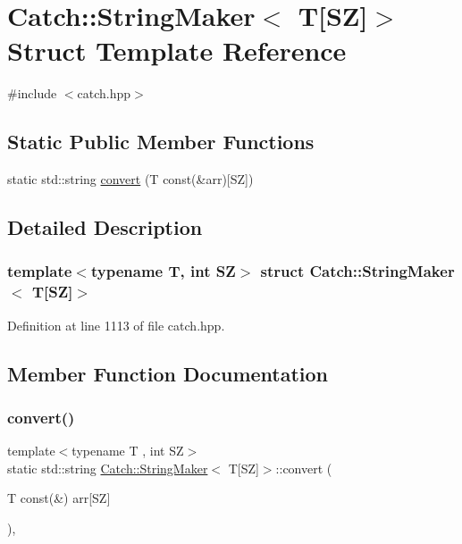 \hypertarget{struct_catch_1_1_string_maker_3_01_t[_s_z]_4}{}\section{Catch\+:\+:String\+Maker$<$ T\mbox{[}SZ\mbox{]}$>$ Struct Template Reference}
\label{struct_catch_1_1_string_maker_3_01_t[_s_z]_4}


{\ttfamily \#include $<$catch.\+hpp$>$}

\subsection*{Static Public Member Functions}
\begin{DoxyCompactItemize}
\item 
static std\+::string \mbox{\hyperlink{struct_catch_1_1_string_maker_3_01_t[_s_z]_4_a3698cea2c24d8649ec9ecb5fa679eeb7}{convert}} (T const(\&arr)\mbox{[}SZ\mbox{]})
\end{DoxyCompactItemize}


\subsection{Detailed Description}
\subsubsection*{template$<$typename T, int SZ$>$\newline
struct Catch\+::\+String\+Maker$<$ T\mbox{[}\+S\+Z\mbox{]}$>$}



Definition at line 1113 of file catch.\+hpp.



\subsection{Member Function Documentation}
\mbox{\label{struct_catch_1_1_string_maker_3_01_t[_s_z]_4_a3698cea2c24d8649ec9ecb5fa679eeb7}} 
\subsubsection{\texorpdfstring{convert()}{convert()}}
{\footnotesize\ttfamily template$<$typename T , int SZ$>$ \\
static std\+::string \mbox{\hyperlink{struct_catch_1_1_string_maker}{Catch\+::\+String\+Maker}}$<$ T\mbox{[}SZ\mbox{]}$>$\+::convert (\begin{DoxyParamCaption}\item[{T const(\&)}]{arr\mbox{[}\+S\+Z\mbox{]} }\end{DoxyParamCaption})\hspace{0.3cm}{\ttfamily [inline]}, {\ttfamily [static]}}



